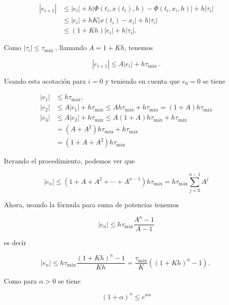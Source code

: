 \documentclass[10pt]{book}
\begin{document}
$$
\begin{aligned}
\left|e_{i+1}\right| & \leq\left|e_{i}\right|+h\left|\Phi\left(t_{i}, x\left(t_{i}\right), h\right)-\Phi\left(t_{i}, x_{i}, h\right)\right|+h\left|\tau_{i}\right| \\
& \leq\left|e_{i}\right|+h K\left|x\left(t_{i}\right)-x_{i}\right|+h\left|\tau_{i}\right| \\
& \leq(1+K h)\left|e_{i}\right|+h\left|\tau_{i}\right| .
\end{aligned}
$$

Como $\left|\tau_{i}\right| \leq \tau_{\text {máx }}$, llamando $A=1+K h$, tenemos

$$
\left|e_{i+1}\right| \leq A\left|e_{i}\right|+h \tau_{\text {máx }} .
$$

Usando esta acotación para $i=0$ y teniendo en cuenta que $e_{0}=0$ se tiene

$$
\begin{aligned}
\left|e_{1}\right| & \leq h \tau_{\operatorname{máx}}, \\
\left|e_{2}\right| & \leq A\left|e_{1}\right|+h \tau_{\operatorname{máx}} \leq A h \tau_{\operatorname{máx}}+h \tau_{\operatorname{máx}}=(1+A) h \tau_{\operatorname{máx}} \\
\left|e_{3}\right| & \leq A\left|e_{2}\right|+h \tau_{\operatorname{máx}} \leq A(1+A) h \tau_{\operatorname{máx}}+h \tau_{\operatorname{máx}} \\
& =\left(A+A^{2}\right) h \tau_{\operatorname{máx}}+h \tau_{\operatorname{máx}} \\
& =\left(1+A+A^{2}\right) h \tau_{\operatorname{máx}}
\end{aligned}
$$

Iterando el procedimiento, podemos ver que

$$
\left|e_{n}\right| \leq\left(1+A+A^{2}+\cdots+A^{n-1}\right) h \tau_{\operatorname{máx}}=h \tau_{\operatorname{máx}} \sum_{j=0}^{n-1} A^{j}
$$

Ahora, usando la fórmula para suma de potencias tenemos

$$
\left|e_{n}\right| \leq h \tau_{\operatorname{máx}} \frac{A^{n}-1}{A-1}
$$

es decir

$$
\left|e_{n}\right| \leq h \tau_{\operatorname{máx}} \frac{(1+K h)^{n}-1}{K h}=\frac{\tau_{\operatorname{máx}}}{K}\left((1+K h)^{n}-1\right) \text {. }
$$

Como para $\alpha>0$ se tiene

$$
(1+\alpha)^{n} \leq e^{n \alpha}
$$
\end{document}
